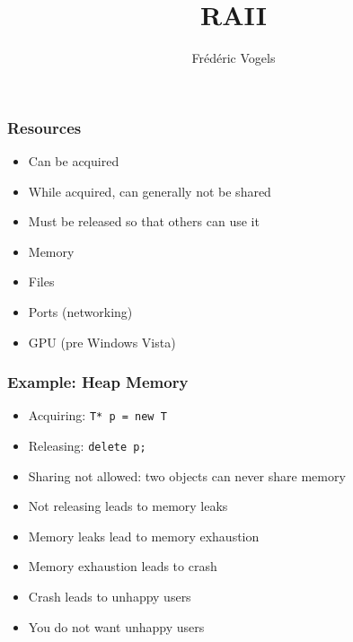 \usepackage{ucll-code}

\usetikzlibrary{shadows,shapes.multipart}

\title{RAII}
\author{Fr\'ed\'eric Vogels}


\lstset{language=c++14}



\begin{frame}
  \titlepage
\end{frame}

\begin{frame}
  \frametitle{Resources}
  \begin{itemize}
    \item Can be acquired
    \item While acquired, can generally not be shared
    \item Must be released so that others can use it
  \end{itemize}
  \vskip5mm
  \begin{itemize}
    \item Memory
    \item Files
    \item Ports (networking)
    \item GPU (pre Windows Vista)
  \end{itemize}
\end{frame}

\begin{frame}
  \frametitle{Example: Heap Memory}
  \begin{itemize}
    \item Acquiring: {\tt T* p = new T}
    \item Releasing: {\tt delete p;}
    \item Sharing not allowed: two objects can never share memory
    \item Not releasing leads to memory leaks 
    \item Memory leaks lead to memory exhaustion
    \item Memory exhaustion leads to crash
    \item Crash leads to unhappy users
    \item You do not want unhappy users
  \end{itemize}
\end{frame}

